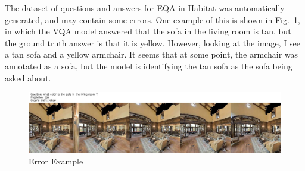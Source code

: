 The dataset of questions and answers for EQA in Habitat was automatically generated, and may contain some errors. One example of this is shown in Fig.~\ref{fig:err_ex}, in which the VQA model answered that the sofa in the living room is tan, but the ground truth answer is that it is yellow. However, looking at the image, I see a tan sofa and a yellow armchair. It seems that at some point, the armchair was annotated as a sofa, but the model is identifying the tan sofa as the sofa being asked about. 

\begin{figure}[h]
	\centering
	\includegraphics[width=\textwidth]{./figure/error_images/ckpt_0_121_image.jpg}
	\caption{Error Example}
	\label{fig:err_ex}
\end{figure}




